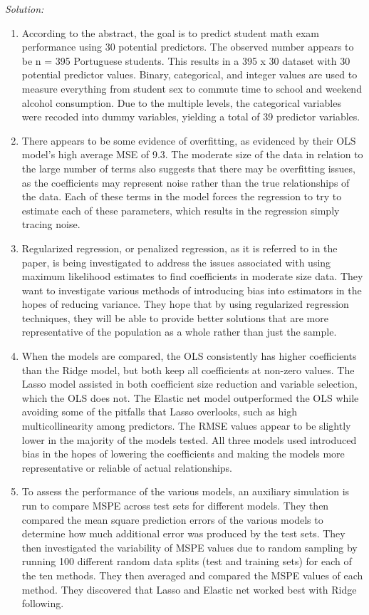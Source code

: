 \documentclass{article}
\newenvironment{solution}
    {\textit{Solution:}}
    {}
\begin{document}
\begin{solution}
\begin{enumerate}
	\item  According to the abstract, the goal is to predict student math exam performance using 30 potential predictors. The observed number appears to be n = 395 Portuguese students. This results in a 395 x 30 dataset with 30 potential predictor values. Binary, categorical, and integer values are used to measure everything from student sex to commute time to school and weekend alcohol consumption. Due to the multiple levels, the categorical variables were recoded into dummy variables, yielding a total of 39 predictor variables.
	\item There appears to be some evidence of overfitting, as evidenced by their OLS model's high average MSE of 9.3. The moderate size of the data in relation to the large number of terms also suggests that there may be overfitting issues, as the coefficients may represent noise rather than the true relationships of the data. Each of these terms in the model forces the regression to try to estimate each of these parameters, which results in the regression simply tracing noise.
	\item Regularized regression, or penalized regression, as it is referred to in the paper, is being investigated to address the issues associated with using maximum likelihood estimates to find coefficients in moderate size data. They want to investigate various methods of introducing bias into estimators in the hopes of reducing variance. They hope that by using regularized regression techniques, they will be able to provide better solutions that are more representative of the population as a whole rather than just the sample.
	\item When the models are compared, the OLS consistently has higher coefficients than the Ridge model, but both keep all coefficients at non-zero values. The Lasso model assisted in both coefficient size reduction and variable selection, which the OLS does not. The Elastic net model outperformed the OLS while avoiding some of the pitfalls that Lasso overlooks, such as high multicollinearity among predictors. The RMSE values appear to be slightly lower in the majority of the models tested. All three models used introduced bias in the hopes of lowering the coefficients and making the models more representative or reliable of actual relationships.
	\item To assess the performance of the various models, an auxiliary simulation is run to compare MSPE across test sets for different models. They then compared the mean square prediction errors of the various models to determine how much additional error was produced by the test sets. They then investigated the variability of MSPE values due to random sampling by running 100 different random data splits (test and training sets) for each of the ten methods. They then averaged and compared the MSPE values of each method. They discovered that Lasso and Elastic net worked best with Ridge following.

\end{enumerate}
\end{solution}
\end{document}
